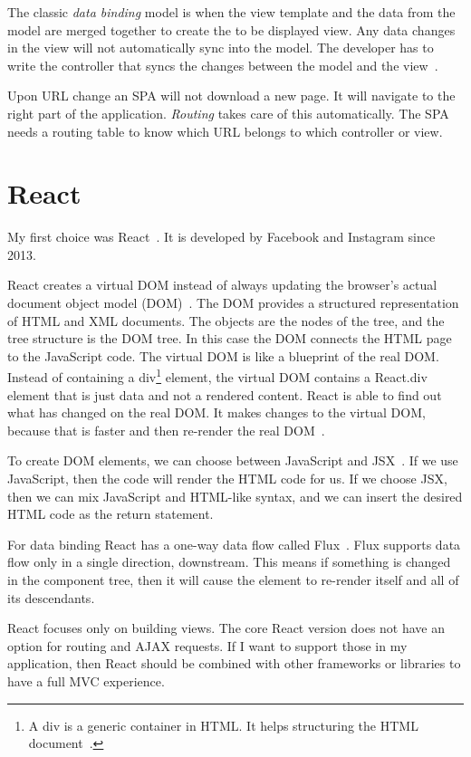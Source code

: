 The classic \emph{data binding} model is when the view template and the data from the model are merged together to create the to be displayed view. Any data changes in the view will not automatically sync into the model. The developer has to write the controller that syncs the changes between the model and the view~\cite{Angular-Developer-DataBinding}.

Upon URL change an SPA will not download a new page. It will navigate to the right part of the application. \emph{Routing} takes care of this automatically. The SPA needs a routing table to know which URL belongs to which controller or view.

\section{React}

My first choice was React~\cite{React}. It is developed by Facebook and Instagram since 2013.

React creates a virtual DOM instead of always updating the browser's actual document object model (DOM)~\cite{dom}. The DOM provides a structured representation of HTML and XML documents. The objects are the nodes of the tree, and the tree structure is the DOM tree. In this case the DOM connects the HTML page to the JavaScript code. The virtual DOM is like a blueprint of the real DOM. Instead of containing a div\footnote{A div is a generic container in HTML. It helps structuring the HTML document~\cite{div}.} element, the virtual DOM contains a React.div element that is just data and not a rendered content. React is able to find out what has changed on the real DOM. It makes changes to the virtual DOM, because that is faster and then re-render the real DOM~\cite{React-Virtual-DOM}.

To create DOM elements, we can choose between JavaScript and JSX~\cite{JSX}. If we use JavaScript, then the code will render the HTML code for us. If we choose JSX, then we can mix JavaScript and HTML-like syntax, and we can insert the desired HTML code as the return statement. 

For data binding React has a one-way data flow called Flux~\cite{Flux}. Flux supports data flow only in a single direction, downstream. This means if something is changed in the component tree, then it will cause the element to re-render itself and all of its descendants.

React focuses only on building views. The core React version does not have an option for routing and AJAX requests. If I want to support those in my application, then React should be combined with other frameworks or libraries to have a full MVC experience.

